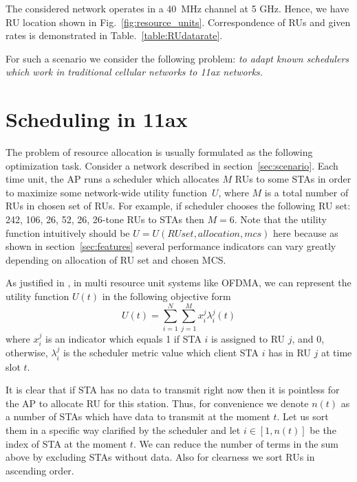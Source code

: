 The considered network operates in a \SI{40}{\MHz} channel at 5 GHz. Hence, we have RU location shown in Fig.~\ref{fig:resource_units}. 
Correspondence of RUs and given rates is demonstrated in Table.~\ref{table:RUdatarate}.

For such a scenario we consider the following problem: \textit{to adapt known schedulers which work in traditional cellular networks to 11ax networks.}

\section{Scheduling in 11ax}
\label{sec:scheduling}

The problem of resource allocation is usually formulated as the following optimization task.
Consider a network described in section~\ref{sec:scenario}.
Each time unit, the AP runs a scheduler which allocates $M$ RUs to some STAs in order to maximize some network-wide utility function~$U$, where $M$ is a total number of RUs in chosen set of RUs. 
For example, if scheduler chooses the following RU set: 242, 106, 26, 52, 26, 26-tone RUs to STAs then $M = 6$. 
Note that the utility function intuitively should be $U = U(RU set, allocation, mcs)$ here because as shown in section~\ref{sec:features} several performance indicators can vary greatly depending on allocation of RU set and chosen MCS.

As justified in \cite{andrews2010scheduling}, in multi resource unit systems like OFDMA, we can represent the utility function $U(t)$ in the following objective form
\begin{equation}
\label{eq:obj}
U(t) = \sum_{i = 1}^{N} \sum_{j = 1}^{M} x_i^j \lambda_i^j (t)
\end{equation}
where $x_i^j$ is an indicator which equals 1 if STA $i$ is assigned to RU $j$, and 0, otherwise, $\lambda_i^j$ is the scheduler metric value which client STA $i$ has in RU $j$ at time slot $t$. 

It is clear that if STA has no data to transmit right now then it is pointless for the AP to allocate RU for this station. Thus, for convenience we denote $n(t)$ as a number of STAs which have data to transmit at the moment $t$. Let us sort them in a specific way clarified by the scheduler and let $i\in[1, n(t)]$ be the index of STA at the moment $t$. We can reduce the number of terms in the sum above by excluding STAs without data. Also for clearness we sort RUs in ascending order.

